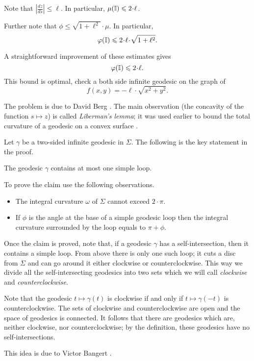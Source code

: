 Note that $|\tfrac{dz}{ds}|\le \ell$.
In particular, $\mu(\II)\le 2\cdot\ell$.

Further note that $\phi\le \sqrt{1+\ell^2}\cdot\mu$.
In particular, 
$$\phi(\II)\le 2\cdot\ell\cdot\sqrt{1+\ell^2}.$$

A straightforward improvement of these estimates gives 
$$\phi(\II)\le 2\cdot\ell.$$
This bound is optimal, check a both side infinite geodesic on the graph of  
\[f(x,y)=-\ell\cdot\sqrt{x^2+y^2}.\]
\qedsf

The problem is due to David Berg \cite[see][]{berg}.
The main observation (the concavity of the function $s\mapsto z$)
is called \emph{Liberman’s lemma}; 
it was used earlier 
to bound the total curvature
of a geodesic on a convex surface \cite[see][]{liberman}.

Let $\gamma$ be a two-sided infinite geodesic in $\Sigma$.
The following is the key statement in the proof.

The geodesic $\gamma$ contains at most one simple loop.
\medskip

To prove the claim use the following observations.
\begin{itemize}
\item The integral curvature $\omega$ of $\Sigma$ cannot exceed $2\cdot\pi$.
\item If $\phi$ is the angle at the base of a simple geodesic loop then the integral curvature surrounded by the loop equals to $\pi+\phi$.
\end{itemize}

Once the claim is proved, 
note that, 
if a geodesic $\gamma$ has a self-intersection,
then it contains a simple loop.
From above there is only one such loop;
it cuts a disc from $\Sigma$ 
and can go around it either clockwise or counterclockwise.
This way we divide all the self-intersecting geodesics 
into two sets which we will call {}\emph{clockwise} and {}\emph{counterclockwise}.

Note that the geodesic $t\mapsto \gamma(t)$ is clockwise 
if and only if 
$t\mapsto \gamma(-t)$
is counterclockwise.
The sets of clockwise and counterclockwise are open and the space of geodesics is connected. 
It follows that there are geodesics 
which are, neither clockwise, nor counterclockwise;
by the definition, these geodesics have no self-intersections.\qeds


This idea is due to 
Victor Bangert \cite[see Cor. 2 in][]{bangert}.

